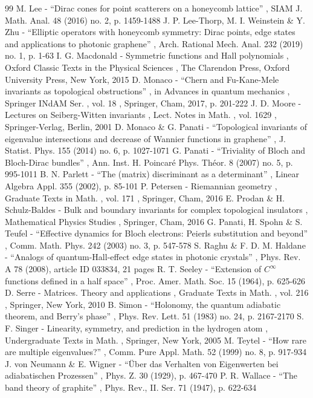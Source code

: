 \begin{thebibliography}{99}
 M. Lee - “Dirac cones for point scatterers on a honeycomb lattice” , SIAM J. Math. Anal. 48 (2016) no. 2, p. 1459-1488
 J. P. Lee-Thorp, M. I. Weinstein \& Y. Zhu - “Elliptic operators with honeycomb symmetry: Dirac points, edge states and applications to photonic graphene” , Arch. Rational Mech. Anal. 232 (2019) no. 1, p. 1-63
 I. G. Macdonald - Symmetric functions and Hall polynomials , Oxford Classic Texts in the Physical Sciences , The Clarendon Press, Oxford University Press, New York, 2015
 D. Monaco - “Chern and Fu-Kane-Mele invariants as topological obstructions” , in Advances in quantum mechanics , Springer INdAM Ser. , vol. 18 , Springer, Cham, 2017, p. 201-222
 J. D. Moore - Lectures on Seiberg-Witten invariants , Lect. Notes in Math. , vol. 1629 , Springer-Verlag, Berlin, 2001
 D. Monaco \& G. Panati - “Topological invariants of eigenvalue intersections and decrease of Wannier functions in graphene” , J. Statist. Phys. 155 (2014) no. 6, p. 1027-1071
 G. Panati - “Triviality of Bloch and Bloch-Dirac bundles” , Ann. Inst. H. Poincaré Phys. Théor. 8 (2007) no. 5, p. 995-1011
 B. N. Parlett - “The (matrix) discriminant as a determinant” , Linear Algebra Appl. 355 (2002), p. 85-101
 P. Petersen - Riemannian geometry , Graduate Texts in Math. , vol. 171 , Springer, Cham, 2016
 E. Prodan \& H. Schulz-Baldes - Bulk and boundary invariants for complex topological insulators , Mathematical Physics Studies , Springer, Cham, 2016
 G. Panati, H. Spohn \& S. Teufel - “Effective dynamics for Bloch electrons: Peierls substitution and beyond” , Comm. Math. Phys. 242 (2003) no. 3, p. 547-578
 S. Raghu \& F. D. M. Haldane - “Analogs of quantum-Hall-effect edge states in photonic crystals” , Phys. Rev. A 78 (2008), article ID 033834, 21 pages
 R. T. Seeley - “Extension of $C^{\infty }$ functions defined in a half space” , Proc. Amer. Math. Soc. 15 (1964), p. 625-626
 D. Serre - Matrices. Theory and applications , Graduate Texts in Math. , vol. 216 , Springer, New York, 2010
 B. Simon - “Holonomy, the quantum adiabatic theorem, and Berry’s phase” , Phys. Rev. Lett. 51 (1983) no. 24, p. 2167-2170
 S. F. Singer - Linearity, symmetry, and prediction in the hydrogen atom , Undergraduate Texts in Math. , Springer, New York, 2005
 M. Teytel - “How rare are multiple eigenvalues?” , Comm. Pure Appl. Math. 52 (1999) no. 8, p. 917-934
 J. von Neumann \& E. Wigner - “Über das Verhalten von Eigenwerten bei adiabatischen Prozessen” , Phys. Z. 30 (1929), p. 467-470
 P. R. Wallace - “The band theory of graphite” , Phys. Rev., II. Ser. 71 (1947), p. 622-634
\end{thebibliography}
